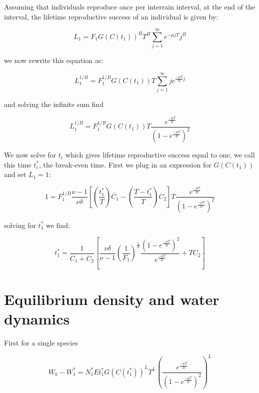\documentclass[11pt]{article}
\begin{document}
Assuming that individuals reproduce once per interrain interval, at the end of the interval, the lifetime reproductive success of an individual is given by:

\begin{equation}
L_1 = F_1 G(C(t_1))^B T^B \sum_{j=1}^{\infty} e^{-\mu j T} j^B
\end{equation}

we now rewrite this equation as:

\begin{equation}
L_1^{1/B} = F_1^{1/B} G(C(t_1)) T \sum_{j=1}^{\infty} j e^{\frac{-\mu T}{B}j}
\end{equation}

and solving the infinite sum find

\begin{equation}
L_1^{1/B} = F_1^{1/B} G(C(t_1)) T  \frac{e^{\frac{-\mu T}{B}}}{\left(1 - e^{\frac{-\mu T}{B}} \right)^2}
\end{equation}

We now solve for \(t_i\) which gives lifetime reproductive success equal to one, we call this time \(t_i^*\), the break-even time. First we plug in an expression for \(G(C(t_1))\) and set \(L_1 = 1\):

\begin{equation}
1 = F_1^{1/B} \frac{\nu-1}{\nu \delta} \left[\left(\frac{t_1^*}{T}\right)\overline{C_1} - \left(\frac{T-t_1^*}{T} \right) C_2 \right] T  \frac{e^{\frac{-\mu T}{B}}}{\left(1 - e^{\frac{-\mu T}{B}} \right)^2}
\end{equation}

solving for \(t_1^*\) we find:

\begin{equation}
t_1^* = \frac{1}{\overline{C_1} + C_2} \left[ \frac{\nu \delta}{\nu - 1} \left(\frac{1}{F_1}\right)^{\frac{1}{B}} \frac{\left(1 - e^{\frac{-\mu T}{B}} \right)^2}{e^{\frac{-\mu T}{B}}}  + T C_2\right]
\end{equation}

\section{Equilibrium density and water dynamics}
\label{sec:orga13447c}

First for a single species

\begin{equation}
W_0 - W_1^* = N_1^* E t_1^* G(C(t_1^*))^{L} T^L  \left(\frac{e^{\frac{-\mu T}{B}}}{\left(1 - e^{\frac{-\mu T}{B}} \right)^2}\right)^L
\end{equation}
\end{document}
